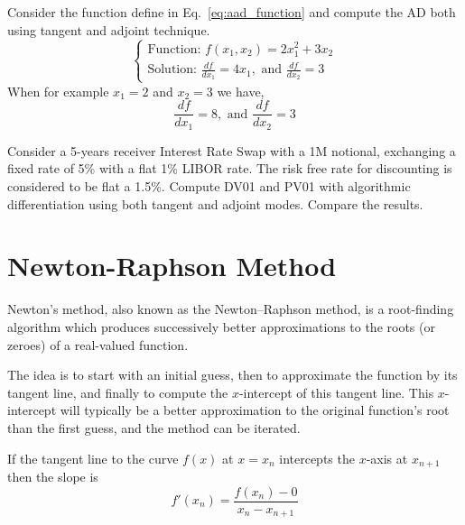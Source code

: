 \documentclass[12pt,a4paper]{article}
\begin{document}
\begin{question}
Consider the function define in Eq.~\ref{eq:aad_function} and compute the AD both using tangent and adjoint technique.
\begin{equation}
\begin{cases}
\text{Function: } f(x_1, x_2) = 2x_1^2 + 3x_2\\
\text{Solution: } \frac{df}{dx_1} = 4x_1, \text{ and } \frac{df}{dx_2}=3
\end{cases}
\end{equation}
When for example $x_1=2$ and $x_2 = 3$ we have,
\begin{equation}
\frac{df}{dx_1} = 8, \text{ and } \frac{df}{dx_2}=3
\end{equation}
\end{question}

\begin{question}
Consider a 5-years receiver Interest Rate Swap with a 1M notional, exchanging a fixed rate of 5\% with a flat 1\% LIBOR rate. The risk free rate for discounting is considered to be flat a 1.5\%.
Compute DV01 and PV01 with algorithmic differentiation using both tangent and adjoint modes. Compare the results.
\end{question}
\clearpage

\section{Newton-Raphson Method}
Newton's method, also known as the Newton–Raphson method, is a root-finding algorithm which produces successively better approximations to the roots (or zeroes) of a real-valued function. %

The idea is to start with an initial guess, then to approximate the function by its tangent line, and finally to compute the $x$-intercept of this tangent line. This $x$-intercept will typically be a better approximation to the original function's root than the first guess, and the method can be iterated.

If the tangent line to the curve $f(x)$ at $x = x_n$ intercepts the $x$-axis at $x_{n+1}$ then the slope is
\begin{equation}
	f'(x_n)=\dfrac {f(x_{n})-0}{x_{n}-x_{n+1}}
\end{equation}
\end{document}
